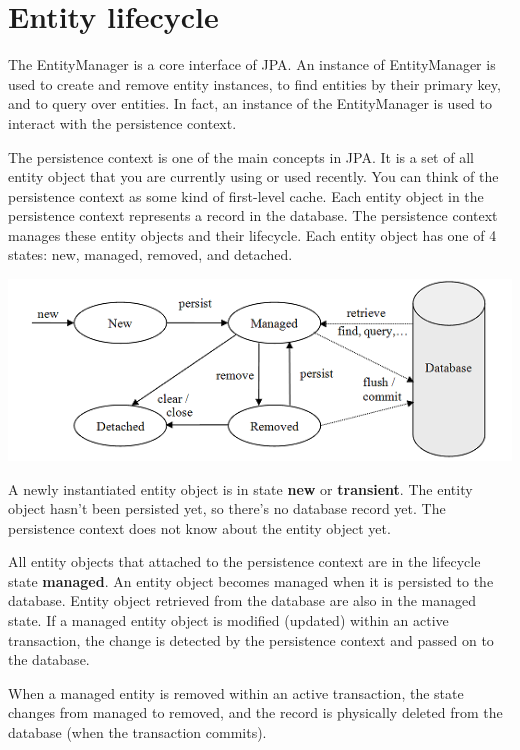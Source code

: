 \section{Entity lifecycle}

The EntityManager is a core interface of JPA.  An instance of EntityManager is used to create and remove  entity instances, to find entities by their primary key,  and to query over entities.  In fact,  an instance of the EntityManager is used to interact with the persistence context. 

The persistence context is one of the main concepts in JPA.
It is a set of all entity object that you are currently using or used recently. You can think of the persistence context as some kind of first-level cache. Each entity object in the persistence context represents a record in the database.
The persistence context manages these entity objects and their lifecycle. Each entity object has one of 4 states: new, managed, removed, and detached.

\includegraphics[width=\textwidth]{./images/chapter6/entity_states}

A newly instantiated entity object is in state \textbf{new} or \textbf{transient}. The entity object hasn't been persisted yet, so there's no database record yet. The persistence context does not know about the entity object yet. 

All entity objects that attached to the persistence context are in the lifecycle state \textbf{managed}. An entity object becomes managed when it is persisted to the database. Entity object retrieved from the database are also in the managed state.
If a managed entity object is modified (updated) within an active transaction, the change is detected by the persistence context and passed on to the database.

When a managed entity is removed within an active transaction, the state changes from managed to removed, and the record is physically deleted from the database (when the transaction commits).

